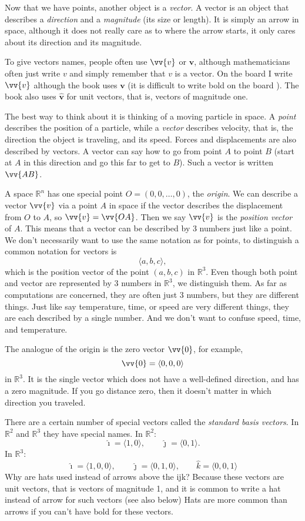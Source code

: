 \documentclass[11pt]{article}
\newcommand{\R}{{\mathbb{R}}}
\newcommand{\veci}{\hat{\imath}}
\newcommand{\vecj}{\hat{\jmath}}
\newcommand{\veck}{\hat{k}}
\begin{document}
Now that we have points, another object is a \emph{vector}.
A vector is an object that describes a \emph{direction} and a \emph{magnitude} (its size or length).
It is simply an arrow in space,
although it does not really care as to where the arrow starts,
it only cares about its direction and its magnitude.

To give vectors names, people often use
$\vv{v}$ or $\mathbf{v}$, although mathematicians often just write $v$ and simply remember
that $v$ is a vector.
On the board I write $\vv{v}$ although the book uses $\mathbf{v}$
(it is difficult to write bold on the board \Smiley{}).
The book also uses $\mathbf{\hat{v}}$ for unit vectors, that is,
vectors of magnitude one.

The best way to think about it is thinking of a moving particle in space.
A \emph{point} describes the position of a particle,
while a \emph{vector} describes velocity, that is, the direction the object is traveling, and its speed.
Forces and displacements are also described by vectors.
A vector can say how to go from point $A$ to point $B$
(start at $A$ in this direction and go this far to get to $B$).
Such a vector is written $\vv{AB}$.

A space $\R^n$ has one special point $O = (0,0,\ldots,0)$, the \emph{origin}.
We can describe a vector $\vv{v}$ via a point $A$ in space if the vector describes the
displacement from $O$ to $A$, so $\vv{v} = \vv{OA}$.
Then we say $\vv{v}$ is the \emph{position vector} of $A$.
This means that a vector can be described by 3 numbers just like a point.
We don't necessarily want to use the same notation as for points, to distinguish
a common notation for vectors is
$$
\langle a,b,c \rangle ,
$$
which is the position vector of the point $(a,b,c)$ in $\R^3$.
Even though both point and vector are represented by 3 numbers in $\R^3$,
we distinguish them.
As far as computations are concerned,
they are often just 3 numbers, but they are different things.
Just like say temperature, time, or speed are very different
things, they are each described by a single number.  And we don't want to
confuse speed, time, and temperature.

The analogue of the origin is the zero vector $\vv{0}$, for example,
$$
\vv{0} = \langle 0,0,0 \rangle
$$
in $\R^3$.
It is the single vector which does not have a well-defined direction,
and has a zero magnitude.
If you go distance zero, then it doesn't matter in which direction
you traveled.

There are a certain number of special vectors called the
\emph{standard basis vectors}.
In $\R^2$ and $\R^3$ they have special names.
In $\R^2$:
$$
\veci = \langle 1 , 0 \rangle, \qquad
\vecj = \langle 0 , 1 \rangle.
$$
In $\R^3$:
$$
\veci = \langle 1, 0, 0 \rangle, \qquad
\vecj = \langle 0, 1, 0 \rangle, \qquad
\veck = \langle 0, 0, 1 \rangle
$$
Why are hats used instead of arrows above the ijk? Because these vectors are
unit vectors, that is vectors of magnitude 1, and it is common to write a hat instead of
arrow for such vectors (see also below)
Hats are more common than arrows if you can't have bold for these vectors.
\end{document}
